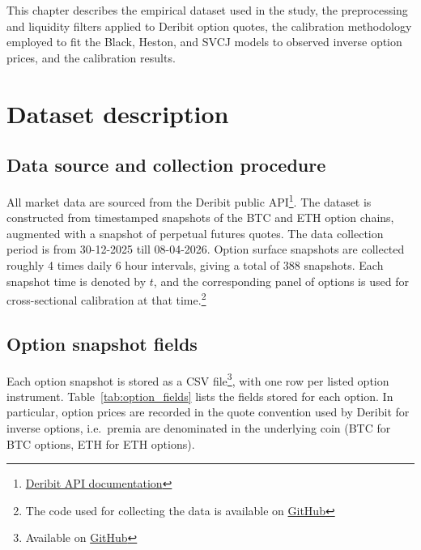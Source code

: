 \documentclass[a4paper,titlepage,12pt]{report}
\theoremstyle{plain}
\begin{document}
This chapter describes the empirical dataset used in the study, the preprocessing and liquidity filters applied to Deribit option quotes, the calibration methodology employed to fit the Black, Heston, and SVCJ models to observed inverse option prices, and the calibration results.

\section{Dataset description}\label{sec:data_description}

\subsection{Data source and collection procedure}\label{subsec:data_collection}

All market data are sourced from the Deribit public API\footnote{\href{https://docs.deribit.com/}{Deribit API documentation}}. The dataset is constructed from timestamped snapshots of the BTC and ETH option chains, augmented with a snapshot of perpetual futures quotes. The data collection period is from 30-12-2025 till 08-04-2026. 
Option surface snapshots are collected roughly 4 times daily 6 hour intervals, giving a total of 388 snapshots. Each snapshot time is denoted by $t$, and the corresponding panel of options is used for cross-sectional calibration at that time.\footnote{The code used for collecting the data is available on \href{https://github.com/znmahbub/SVCJ-Deribit-Inverse-Options-Pricer/blob/main/src/collect_deribit_snapshot.py}{GitHub}}

\subsection{Option snapshot fields}\label{subsec:option_fields}

Each option snapshot is stored as a CSV file\footnote{Available on \href{https://github.com/znmahbub/SVCJ-Deribit-Inverse-Options-Pricer/tree/main/data}{GitHub}}, with one row per listed option instrument. Table~\ref{tab:option_fields} lists the fields stored for each option. In particular, option prices are recorded in the quote convention used by Deribit for inverse options, i.e.\ premia are denominated in the underlying coin (BTC for BTC options, ETH for ETH options).
\end{document}
